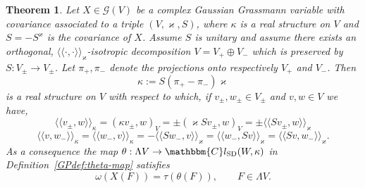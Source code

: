 \documentclass[11pt]{article}
\newcommand{\assign}{:=}
\newcommand{\cdummy}{\cdot}
\newcommand{\llangle}{{\langle\!\langle}}
\newcommand{\rrangle}{{\rangle\!\rangle}}
\newcommand{\tmop}[1]{\ensuremath{\operatorname{#1}}}
\newtheorem{theorem}{Theorem}
\begin{document}
\begin{theorem}
  \label{GPth:relation}Let $X \in \mathcal{G} (V)$ be a complex Gaussian
  Grassmann variable with covariance associated to a triple $(V, \varkappa,
  S)$, where $\kappa$ is a real structure on $V$ and $S = - S^{\varkappa}$ is
  the covariance of $X$. Assume $S$ is unitary and assume there exists an
  orthogonal, $\llangle \cdummy, \cdummy \rrangle_{\varkappa}$-isotropic
  decomposition $V = V_+ \oplus V_-$ which is preserved by $S : V_{\pm}
  \rightarrow V_{\pm}$. Let $\pi_+, \pi_-$ denote the projections onto
  respectively $V_+$ and $V_-$. Then
  \[ \kappa \assign  S (\pi_+ - \pi_-) \varkappa \]
  is a real structure on $V$ with respect to which, if $v_{\pm}, w_{\pm} \in
  V_{\pm}$ and $v, w \in V$ we have,
  \begin{equation}
    \llangle v_{\pm}, w \rrangle_{\kappa} = (\kappa v_{\pm}, w)_V = \pm
    (\varkappa S v_{\pm}, w)_V = \pm \llangle S v_{\pm}, w
    \rrangle_{\varkappa} \label{eq:cov-pm}
  \end{equation}
  \begin{equation}
    \llangle v, w_- \rrangle_{\kappa} = \llangle w_-, v \rrangle_{\kappa} = -
    \llangle S w_-, v \rrangle_{\varkappa} = \llangle w_-, S v
    \rrangle_{\varkappa} = \llangle S v, w_- \rrangle_{\varkappa} .
    \label{eq:cov-pm-2}
  \end{equation}
  As a consequence the map $\theta : \Lambda V \rightarrow
  \mathbbm{C}l_{\tmop{SD}} (W, \kappa)$ in Definition~\ref{GPdef:theta-map}
  satisfies
  \begin{equation}
    \omega (X (F)) = \tau (\theta (F)), \qquad F \in \Lambda V.
    \label{eq:relation-OS-GP}
  \end{equation}
\end{theorem}
\end{document}
